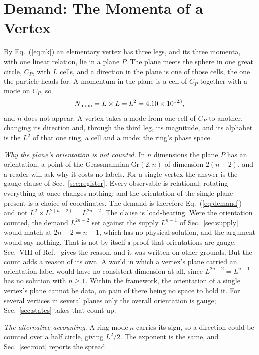 \documentclass[aps,prd,twocolumn,superscriptaddress,nofootinbib]{revtex4-2}
\begin{document}
\section{Demand: The Momenta of a Vertex}
\label{sec:demand}

By Eq.~(\ref{eq:nk}) an elementary vertex has three legs, and its three momenta, with one linear relation, lie in a plane $P$. The plane meets the sphere in one great circle, $C_P$, with $L$ cells, and a direction in the plane is one of those cells, the one the particle heads for. A momentum in the plane is a cell of $C_P$ together with a mode on $C_P$, so
\begin{equation}
N_{\rm mom} = L\times L = L^2 = 4.10\times10^{123},
\label{eq:demand}
\end{equation}
and $n$ does not appear. A vertex takes a mode from one cell of $C_P$ to another, changing its direction and, through the third leg, its magnitude, and its alphabet is the $L^2$ of that one ring, a cell and a mode: the ring's phase space.

\textit{Why the plane's orientation is not counted.} In $n$ dimensions the plane $P$ has an orientation, a point of the Grassmannian $\mathrm{Gr}(2,n)$ of dimension $2(n-2)$, and a reader will ask why it costs no labels. For a single vertex the answer is the gauge clause of Sec.~\ref{sec:register}. Every observable is relational; rotating everything at once changes nothing; and the orientation of the single plane present is a choice of coordinates. The demand is therefore Eq.~(\ref{eq:demand}) and not $L^2\times L^{2(n-2)} = L^{2n-2}$. The clause is load-bearing. Were the orientation counted, the demand $L^{2n-2}$ set against the supply $L^{n-1}$ of Sec.~\ref{sec:supply} would match at $2n-2 = n-1$, which has no physical solution, and the argument would say nothing. That is not by itself a proof that orientations are gauge; Sec.~VIII of Ref.~\cite{korytko2026c} gives the reason, and it was written on other grounds. But the count adds a reason of its own. A world in which a vertex's plane carried an orientation label would have no consistent dimension at all, since $L^{2n-2} = L^{n-1}$ has no solution with $n \ge 1$. Within the framework, the orientation of a single vertex's plane cannot be data, on pain of there being no space to hold it. For several vertices in several planes only the overall orientation is gauge; Sec.~\ref{sec:states} takes that count up.

\textit{The alternative accounting.} A ring mode $\kappa$ carries its sign, so a direction could be counted over a half circle, giving $L^2/2$. The exponent is the same, and Sec.~\ref{sec:root} reports the spread.
\end{document}
